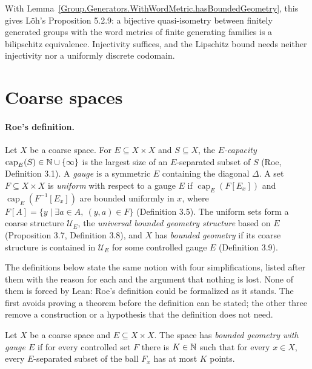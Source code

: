 With Lemma~\ref{Group.Generators.WithWordMetric.hasBoundedGeometry}, this gives L\"oh's
Proposition 5.2.9: a bijective quasi-isometry between finitely generated groups with the word
metrics of finite generating families is a bilipschitz equivalence. Injectivity suffices, and the
Lipschitz bound needs neither injectivity nor a uniformly discrete codomain.

\section*{Coarse spaces}

\paragraph{Roe's definition.} Let $X$ be a coarse space. For $E \subseteq X \times X$ and
$S \subseteq X$, the \emph{$E$-capacity} $\operatorname{cap}_E(S) \in \mathbb{N} \cup \{\infty\}$ is the
largest size of an $E$-separated subset of $S$ (Roe, Definition 3.1). A \emph{gauge} is a
symmetric $E$ containing the diagonal $\Delta$. A set $F \subseteq X \times X$ is \emph{uniform}
with respect to a gauge $E$ if $\operatorname{cap}_E(F[E_x])$ and
$\operatorname{cap}_E(F^{-1}[E_x])$ are bounded uniformly in $x$, where
$F[A] = \{y \mid \exists a \in A,\ (y, a) \in F\}$ (Definition 3.5). The uniform sets form a
coarse structure $\mathcal{U}_E$, the \emph{universal bounded geometry structure} based on $E$
(Proposition 3.7, Definition 3.8), and $X$ has \emph{bounded geometry} if its coarse structure
is contained in $\mathcal{U}_E$ for some controlled gauge $E$ (Definition 3.9).

The definitions below state the same notion with four simplifications, listed after them with
the reason for each and the argument that nothing is lost. None of them is forced by Lean:
Roe's definition could be formalized as it stands. The first avoids proving a theorem before
the definition can be stated; the other three remove a construction or a hypothesis that the
definition does not need.

\begin{definition}
  \label{CoarseSpace.HasBoundedGeometryWith}
  Let $X$ be a coarse space and $E \subseteq X \times X$. The space has \emph{bounded geometry
  with gauge $E$} if for every controlled set $F$ there is $K \in \mathbb{N}$ such that for every
  $x \in X$, every $E$-separated subset of the ball $F_x$ has at most $K$ points.
\end{definition}

